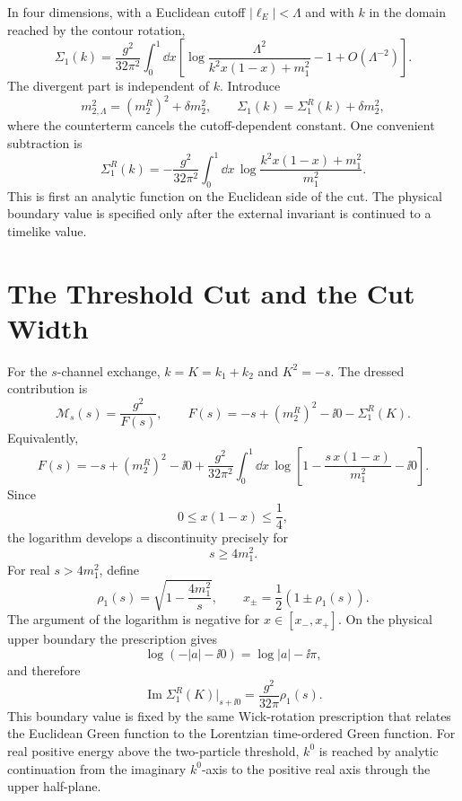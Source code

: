 In four dimensions, with a Euclidean cutoff \(|\ell_E|<\Lambda\) and with
\(k\) in the domain reached by the contour rotation,
\[
  \Sigma_1(k)
  =
  \frac{g^2}{32\pi^2}
  \int_0^1\dd x
  \left[
    \log
    \frac{\Lambda^2}{k^2x(1-x)+m_1^2}
    -1+O(\Lambda^{-2})
  \right].
\]
The divergent part is independent of \(k\). Introduce
\[
  m_{2,\Lambda}^2=(m_2^R)^2+\delta m_2^2,
  \qquad
  \Sigma_1(k)=\Sigma_1^R(k)+\delta m_2^2 ,
\]
where the counterterm cancels the cutoff-dependent constant. One convenient
subtraction is
\[
  \Sigma_1^R(k)
  =
  -\frac{g^2}{32\pi^2}
  \int_0^1\dd x\,
  \log
  \frac{k^2x(1-x)+m_1^2}{m_1^2}.
\]
This is first an analytic function on the Euclidean side of the cut.  The
physical boundary value is specified only after the external invariant is
continued to a timelike value.

\section{The Threshold Cut and the Cut Width}

For the \(s\)-channel exchange, \(k=K=k_1+k_2\) and \(K^2=-s\). The dressed
contribution is
\[
  \mathcal M_s(s)
  =
  \frac{g^2}{F(s)},
  \qquad
  F(s)=
  -s+(m_2^R)^2-\ii0-\Sigma_1^R(K).
\]
Equivalently,
\[
  F(s)
  =
  -s+(m_2^R)^2-\ii0
  +
  \frac{g^2}{32\pi^2}
  \int_0^1\dd x\,
  \log\left[
    1-\frac{s\,x(1-x)}{m_1^2}-\ii0
  \right].
\]
Since
\[
  0\le x(1-x)\le\frac14,
\]
the logarithm develops a discontinuity precisely for
\[
  s\ge4m_1^2 .
\]
For real \(s>4m_1^2\), define
\[
  \rho_1(s)=\sqrt{1-\frac{4m_1^2}{s}},
  \qquad
  x_\pm=\frac12\left(1\pm\rho_1(s)\right).
\]
The argument of the logarithm is negative for \(x\in[x_-,x_+]\). On the
physical upper boundary the prescription gives
\[
  \log(-|a|-\ii0)=\log|a|-\ii\pi ,
\]
and therefore
\[
  \operatorname{Im}\Sigma_1^R(K)\big|_{s+\ii0}
  =
  \frac{g^2}{32\pi}\rho_1(s).
\]
This boundary value is fixed by the same Wick-rotation prescription that
relates the Euclidean Green function to the Lorentzian time-ordered Green
function. For real positive energy above the two-particle threshold,
\(k^0\) is reached by analytic continuation from the imaginary \(k^0\)-axis
to the positive real axis through the upper half-plane.

